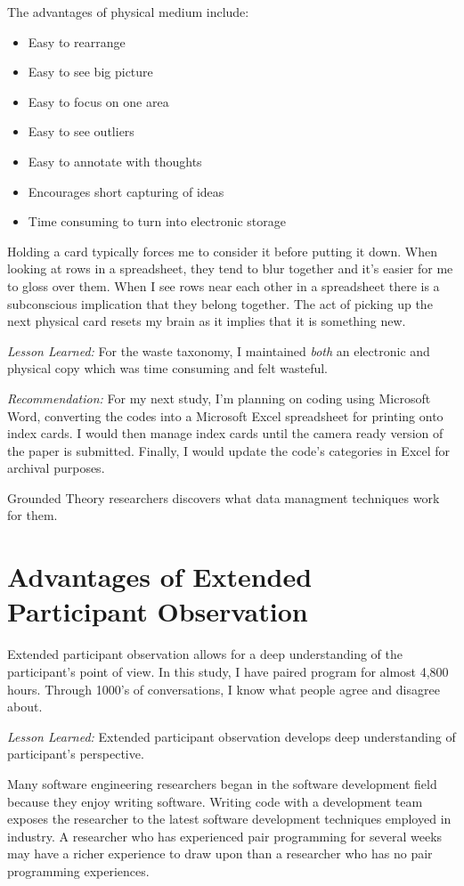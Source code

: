 The advantages of physical medium include:
\begin{itemize}
  \item Easy to rearrange
  \item Easy to see big picture 
  \item Easy to focus on one area
  \item Easy to see outliers
  \item Easy to annotate with thoughts
  \item Encourages short capturing of ideas
  \item Time consuming to turn into electronic storage
\end{itemize}

Holding a card typically forces me to consider it before putting it down. When looking at rows in a spreadsheet, they tend to blur together and it's easier for me to gloss over them. When I see rows near each other in a spreadsheet there is a subconscious implication that they belong together. The act of picking up the next physical card resets my brain as it implies that it is something new. 

\textit{Lesson Learned:} For the waste taxonomy, I maintained \textit{both} an electronic and physical copy which was time consuming and felt wasteful. 

\textit{Recommendation:} For my next study, I'm planning on coding using Microsoft Word, converting the codes into a Microsoft Excel spreadsheet for printing onto index cards. I would then manage index cards until the camera ready version of the paper is submitted. Finally, I would update the code's categories in Excel for archival purposes.

Grounded Theory researchers discovers what data managment techniques work for them. 
\section{Advantages of Extended Participant Observation}
Extended participant observation allows for a deep understanding of the participant's point of view. In this study, I have paired program for almost 4,800 hours. Through 1000's of conversations, I know what people agree and disagree about. 

\textit{Lesson Learned:} Extended participant observation develops deep understanding of participant's perspective.

Many software engineering researchers began in the software development field because they enjoy writing software. Writing code with a development team exposes the researcher to the latest software development techniques employed in industry. A researcher who has experienced pair programming for several weeks may have a richer experience to draw upon than a researcher who has no pair programming experiences.

